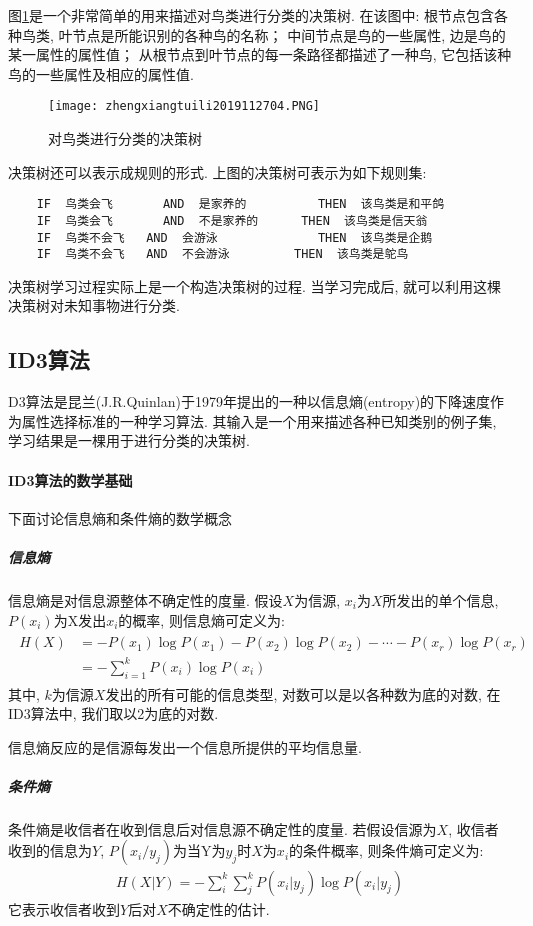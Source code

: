 图\ref{AI32fig2704}是一个非常简单的用来描述对鸟类进行分类的决策树.
在该图中: 根节点包含各种鸟类, 叶节点是所能识别的各种鸟的名称； 中间节点是鸟的一些属性, 边是鸟的某一属性的属性值； 从根节点到叶节点的每一条路径都描述了一种鸟, 它包括该种鸟的一些属性及相应的属性值.
\begin{figure}[H]
\centering
\texttt{[image: zhengxiangtuili2019112704.PNG]}
\caption{对鸟类进行分类的决策树}
\label{AI32fig2704}
\end{figure}
 决策树还可以表示成规则的形式. 上图的决策树可表示为如下规则集:
\begin{Verbatim}
    IF  鸟类会飞       AND  是家养的          THEN  该鸟类是和平鸽
    IF  鸟类会飞       AND  不是家养的      THEN  该鸟类是信天翁
    IF  鸟类不会飞   AND  会游泳              THEN  该鸟类是企鹅
    IF  鸟类不会飞   AND  不会游泳         THEN  该鸟类是鸵鸟
\end{Verbatim}

决策树学习过程实际上是一个构造决策树的过程. 当学习完成后, 就可以利用这棵决策树对未知事物进行分类.
\subsection{ID3算法}
D3算法是昆兰(J.R.Quinlan)于1979年提出的一种以信息熵(entropy)的下降速度作为属性选择标准的一种学习算法. 其输入是一个用来描述各种已知类别的例子集, 学习结果是一棵用于进行分类的决策树.

\paragraph{ID3算法的数学基础}
下面讨论信息熵和条件熵的数学概念
\subparagraph{信息熵}
信息熵是对信息源整体不确定性的度量. 假设$X$为信源, $x_i$为$X$所发出的单个信息, $P(x_i)$为X发出$x_i$的概率, 则信息熵可定义为:
\begin{align}
  \begin{aligned}
  H(X) &=-P\left(x_{1}\right) \log P\left(x_{1}\right)-P\left(x_{2}\right) \log P\left(x_{2}\right)-\cdots-P\left(x_{r}\right) \log P\left(x_{r}\right) \\
                       &=-\sum_{i=1}^{k} P\left(x_{i}\right) \log P\left(x_{i}\right)
  \end{aligned}
\end{align}
其中, $k$为信源$X$发出的所有可能的信息类型, 对数可以是以各种数为底的对数, 在ID3算法中, 我们取以2为底的对数.
\begin{remark}
 信息熵反应的是信源每发出一个信息所提供的平均信息量.
\end{remark}
\subparagraph{条件熵}
条件熵是收信者在收到信息后对信息源不确定性的度量. 若假设信源为$X$, 收信者收到的信息为$Y$,  $P(x_i/y_j)$为当Y为$y_j$时$X$为$x_i$的条件概率, 则条件熵可定义为:
\begin{align}
  H(X | Y)=-\sum_{i}^{k} \sum_{j}^{k} P\left(x_{i} | y_{j}\right) \log P\left(x_{i} | y_{j}\right)
\end{align}
它表示收信者收到$Y$后对$X$不确定性的估计.

